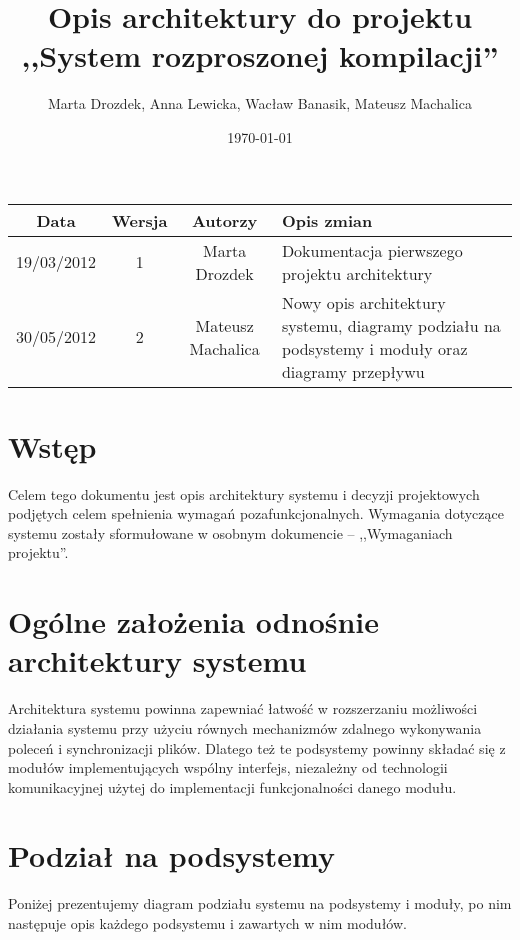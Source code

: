 \documentclass[a4paper]{article}
\title{Opis architektury do projektu ,,System rozproszonej kompilacji''}
\author{Marta Drozdek, Anna Lewicka, Wacław Banasik, Mateusz Machalica}
\date{\today}
\begin{document}
\maketitle

\begin{table}[!h]
	\centering
	\begin{tabular}{|c|c|c|p{8cm}|}
		\hline
		\textbf{Data} & \textbf{Wersja} & \textbf{Autorzy} & \textbf{Opis zmian} \\ \hline
		19/03/2012 & 1 & Marta Drozdek & Dokumentacja pierwszego projektu architektury \\ \hline
		30/05/2012 & 2 & Mateusz Machalica & Nowy opis architektury systemu, diagramy podziału na podsystemy i moduły oraz diagramy przepływu \\ \hline
	\end{tabular}
\end{table}

\section{Wstęp}

Celem tego dokumentu jest opis architektury systemu i decyzji projektowych podjętych celem spełnienia wymagań pozafunkcjonalnych.
Wymagania dotyczące systemu zostały sformułowane w osobnym dokumencie -- ,,Wymaganiach projektu''.



\section{Ogólne założenia odnośnie architektury systemu}

Architektura systemu powinna zapewniać łatwość w rozszerzaniu możliwości działania systemu przy użyciu równych mechanizmów zdalnego wykonywania poleceń i synchronizacji plików.
Dlatego też te podsystemy powinny składać się z modułów implementujących wspólny interfejs, niezależny od technologii komunikacyjnej użytej do implementacji funkcjonalności danego modułu.

\section{Podział na podsystemy}

Poniżej prezentujemy diagram podziału systemu na podsystemy i moduły, po nim następuje opis każdego podsystemu i zawartych w nim modułów.

\end{document}
